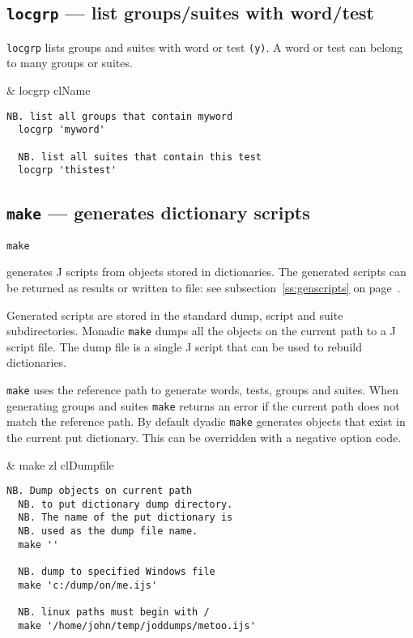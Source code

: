 \subsection{\texttt{locgrp} --- list groups/suites with word/test}\label{ss:locgrp}

\texttt{locgrp} lists groups and suites with word or test \texttt{(y)}.   
A word or test can belong to many groups or suites. 

\begin{wordhead}
\monad & locgrp clName \\
\end{wordhead} 
\begin{lstlisting}[frame=single,framerule=0pt]  
  NB. list all groups that contain myword
  locgrp 'myword' 

  NB. list all suites that contain this test
  locgrp 'thistest' 
\end{lstlisting}


\subsection{\texttt{make} --- generates dictionary scripts}\label{ss:make}

\hypertarget{il:make}{\texttt{make}} generates J 
scripts from objects stored
in dictionaries.
The generated scripts can be returned as results or written to file: 
see subsection~\ref{ss:genscripts} on page~\pageref{ss:genscripts}.

Generated scripts are stored in the standard dump, 
script and suite subdirectories.  Monadic \texttt{make} dumps all the objects 
on the current path to a J script file.  The dump file is a single J script 
that can be used to rebuild dictionaries. 

\texttt{make} uses the reference path to generate words, 
tests, groups and suites.
When generating groups and suites \texttt{make} returns an error if the current 
path does not match the reference path. By default dyadic \texttt{make} generates 
objects that exist in the current put dictionary. 
This can be overridden with a negative option code. 

\begin{wordhead}
\monad & make zl \argsep clDumpfile \\
\end{wordhead}
\begin{lstlisting}[frame=single,framerule=0pt] 
  NB. Dump objects on current path 
  NB. to put dictionary dump directory.
  NB. The name of the put dictionary is 
  NB. used as the dump file name.
  make '' 

  NB. dump to specified Windows file
  make 'c:/dump/on/me.ijs'
  
  NB. linux paths must begin with /
  make '/home/john/temp/joddumps/metoo.ijs'
\end{lstlisting}

